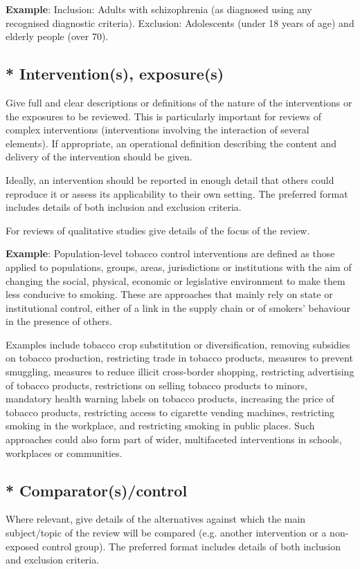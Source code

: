 \documentclass{qqtarticle}
\begin{document}
    \textbf{Example}:
    Inclusion: Adults with schizophrenia (as diagnosed using any recognised diagnostic criteria).
    Exclusion: Adolescents (under 18 years of age) and elderly people (over 70).

    \subsection{* Intervention(s), exposure(s)}
    Give full and clear descriptions or definitions of the nature of the interventions or the exposures to be reviewed. This is
    particularly important for reviews of complex interventions (interventions involving the interaction of several elements). If
    appropriate, an operational definition describing the content and delivery of the intervention should be given.

    Ideally, an intervention should be reported in enough detail that others could reproduce it or assess its applicability to their
    own setting. The preferred format includes details of both inclusion and exclusion criteria.

    For reviews of qualitative studies give details of the focus of the review.

    \textbf{Example}: Population-level tobacco control interventions are defined as those applied to populations, groups, areas,
    jurisdictions or institutions with the aim of changing the social, physical, economic or legislative environment to make them
    less conducive to smoking. These are approaches that mainly rely on state or institutional control, either of a link in the
    supply chain or of smokers' behaviour in the presence of others.

    Examples include tobacco crop substitution or diversification, removing subsidies on tobacco production, restricting trade
    in tobacco products, measures to prevent smuggling, measures to reduce illicit cross-border shopping, restricting
    advertising of tobacco products, restrictions on selling tobacco products to minors, mandatory health warning labels on
    tobacco products, increasing the price of tobacco products, restricting access to cigarette vending machines, restricting
    smoking in the workplace, and restricting smoking in public places. Such approaches could also form part of wider,
    multifaceted interventions in schools, workplaces or communities.

    \subsection{* Comparator(s)/control}
    Where relevant, give details of the alternatives against which the main subject/topic of the review will be compared (e.g.
    another intervention or a non-exposed control group). The preferred format includes details of both inclusion and exclusion
    criteria.
\end{document}
